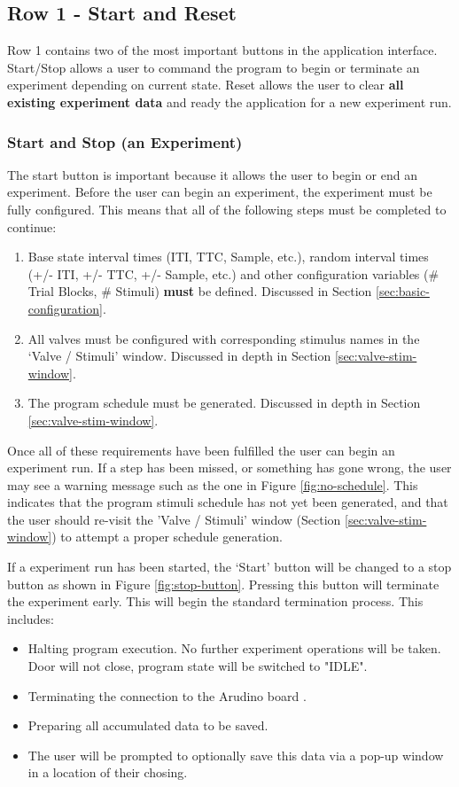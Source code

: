 \documentclass{article}
\begin{document}
\newpage
\subsection{Row 1 - Start and Reset}
Row 1 contains two of the most important buttons in the application interface. Start/Stop allows a user to command the program to begin or 
terminate an experiment depending on current state. Reset allows the user to clear \textbf{all existing experiment data} and ready the application 
for a new experiment run. 

\subsubsection{Start and Stop (an Experiment)}
\label{sec:start-exp}
The start button is important because it allows the user to begin or end an experiment. Before the user can begin an experiment, 
the experiment must be fully configured. This means that all of the following steps must be completed to continue: 
\begin{enumerate}
    \item Base state  interval times (ITI, TTC, Sample, etc.), random interval times (+/- ITI, +/- TTC, +/- Sample, etc.) 
        and other configuration variables (\# Trial Blocks, \# Stimuli) \textbf{must} be defined. Discussed in Section \ref{sec:basic-configuration}.
    \item All valves must be configured with corresponding stimulus names in the `Valve / Stimuli' window. Discussed in depth in Section 
        \ref{sec:valve-stim-window}.
    \item The program schedule must be generated. Discussed in depth in Section 
        \ref{sec:valve-stim-window}.
\end{enumerate}

Once all of these requirements have been fulfilled the user can begin an experiment run. If a step has been missed, or something has 
gone wrong, the user may see a warning message such as the one in Figure \ref{fig:no-schedule}. This indicates that the program stimuli schedule has not 
yet been generated, and that the user should re-visit the 'Valve / Stimuli' window (Section \ref{sec:valve-stim-window}) 
to attempt a proper schedule generation.

If a experiment run has been started, the `Start' button will be changed to a stop button as shown in Figure \ref{fig:stop-button}. 
Pressing this button will terminate the experiment early. This will begin the standard termination process. This includes:
\begin{itemize}
    \item Halting program execution. No further experiment operations will be taken. Door will not close, program state will be 
        switched to "IDLE".
    \item Terminating the connection to the Arudino board .
    \item Preparing all accumulated data to be saved. 
    \item The user will be prompted to optionally save this data via a pop-up window in a location of their chosing.
\end{itemize}
\end{document}
